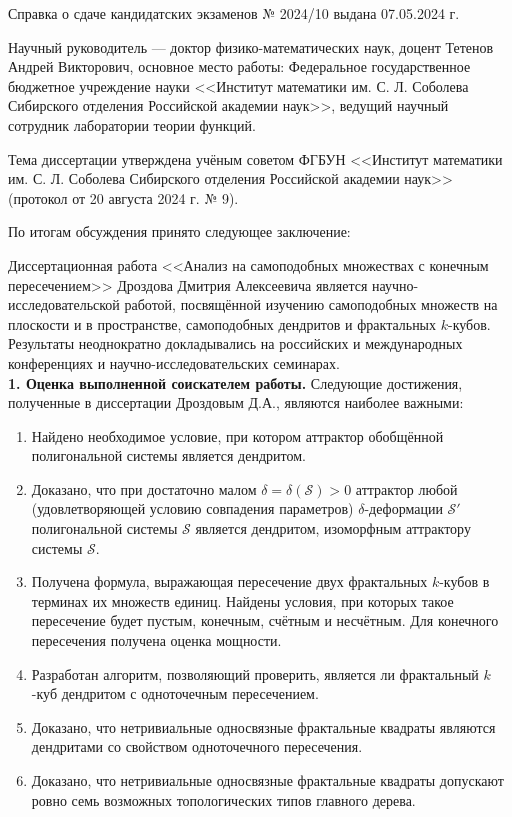 \documentclass[14pt, a4paper]{extarticle}
\begin{document}
Справка о сдаче кандидатских экзаменов № 2024/10 выдана 07.05.2024 г. 

Научный руководитель --- доктор физико-математических наук, доцент Тетенов Андрей Викторович, основное место работы: Федеральное государственное бюджетное учреждение науки <<Институт математики им. С. Л. Соболева Сибирского отделения Российской академии наук>>, ведущий научный сотрудник лаборатории теории функций.

Тема диссертации утверждена учёным советом ФГБУН <<Институт математики им. С. Л. Соболева Сибирского отделения Российской академии наук>> (протокол от 20 августа 2024 г. № 9).

По итогам обсуждения принято следующее заключение:

Диссертационная работа <<Анализ на самоподобных множествах с конечным пересечением>> Дроздова Дмитрия Алексеевича является научно-ис\-сле\-до\-ва\-тель\-ской работой, посвящённой изучению самоподобных множеств на плоскости и в пространстве, самоподобных дендритов и фрактальных $k$-кубов.
Результаты неоднократно докладывались на российских и международных конференциях и научно-исследовательских семинарах.\\

{\bf 1. Оценка выполненной соискателем работы.}
Следующие достижения, полученные в диссертации Дроздовым Д.А., являются наиболее важными:

\begin{enumerate}[nolistsep]
\item Найдено необходимое условие, при котором аттрактор обобщённой полигональной системы является дендритом.
\item Доказано, что при достаточно малом $\delta=\delta(\mathcal{S})>0$ аттрактор любой (удовлетворяющей условию совпадения параметров) $\delta$-деформации $\mathcal{S}'$ полигональной системы $\mathcal{S}$ является дендритом, изоморфным аттрактору системы $\mathcal{S}$.
\item Получена формула, выражающая пересечение двух фрактальных $k$-кубов в терминах их множеств единиц.
Найдены условия, при которых такое пересечение будет пустым, конечным, счётным и несчётным.
Для конечного пересечения получена оценка мощности.
\item Разработан алгоритм, позволяющий проверить, является ли фрактальный $k$-куб дендритом с одноточечным пересечением.
\item Доказано, что нетривиальные односвязные фрактальные квадраты являются дендритами со свойством одноточечного пересечения.
\item Доказано, что нетривиальные односвязные фрактальные квадраты допускают ровно семь возможных топологических типов главного дерева.
\end{enumerate}\quad
\end{document}
